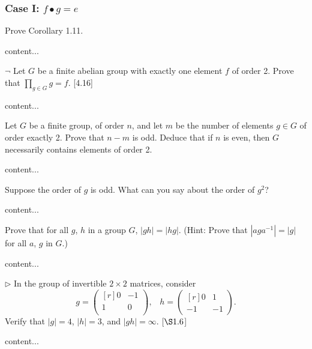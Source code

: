 \begin{solution}
	\subsubsection*{Case I: $f\bullet g = e$}
	
\end{solution}

\begin{exercise}
	Prove Corollary 1.11.
\end{exercise}
\begin{solution}
	content...
\end{solution}

\begin{exercise}
	$\neg$ Let $G$ be a finite abelian group with exactly one element $f$ of order 2. Prove that $\prod_{g\in G}g = f$. [4.16]
\end{exercise}
\begin{solution}
	content...
\end{solution}

\begin{exercise}
	Let $G$ be a finite group, of order $n$, and let $m$ be the number of elements $g\in G$ of order exactly 2. Prove that $n-m$ is odd. Deduce that if $n$ is even, then $G$ necessarily contains elements of order 2.
\end{exercise}
\begin{solution}
	content...
\end{solution}

\begin{exercise}
	Suppose the order of $g$ is odd. What can you say about the order of $g^2$?
\end{exercise}
\begin{solution}
	content...
\end{solution}

\begin{exercise}
	Prove that for all $g$, $h$ in a group $G$, $|gh| = |hg|$. (Hint: Prove that $|aga^{-1}| = |g|$ for all $a$, $g$ in $G$.)
\end{exercise}
\begin{solution}
	content...
\end{solution}

\begin{exercise}
	$\triangleright$ In the group of invertible $2\times 2$ matrices, consider
	\[
		g = 
		\begin{pmatrix*}[r]
			0 & -1\\
			1 & 0\\
		\end{pmatrix*},
		\; \; \;
		h= 
		\begin{pmatrix*}[r]
			0 & 1 \\
			-1 & -1
		\end{pmatrix*}.
	\]
	Verify that $|g| = 4$, $|h| = 3$, and $|gh| = \infty$. [$\S 1.6$]
\end{exercise}
\begin{solution}
	content...
\end{solution}

